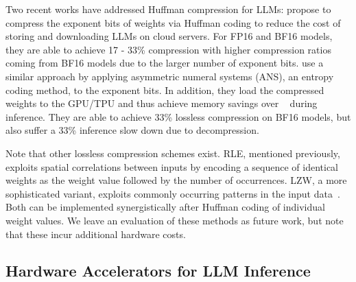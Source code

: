 Two recent works have addressed Huffman compression for LLMs: \cite{hershcovitch2024zipnn} propose to compress the exponent bits of weights via Huffman coding
to reduce the cost of storing and downloading LLMs on cloud servers. For FP16 and BF16 models, they are able to achieve 17 - 33\% compression with higher compression ratios coming from BF16 models due to the larger number of exponent bits. 
\cite{hao2024neuzip} use a similar approach by applying asymmetric numeral systems (ANS), an entropy coding method,  to the exponent bits. In addition, they load the compressed weights to the GPU/TPU and thus achieve memory savings over ~\cite{hershcovitch2024zipnn} during inference. They are able to achieve 33\% lossless compression on BF16 models, but also suffer a 33\% inference slow down due to decompression.


Note that other lossless compression schemes exist. RLE, mentioned previously, 
exploits spatial correlations between inputs by encoding a sequence of identical
weights as the weight value followed by the number of occurrences. 
LZW, a more sophisticated variant, exploits commonly occurring patterns in the input data~\cite{welch1984technique}. Both can be implemented synergistically after Huffman coding of individual weight values. We leave an evaluation of these methods as future work, but note that these incur additional hardware costs.

\subsection{Hardware Accelerators for LLM Inference}
\label{sec:systolic_array}
